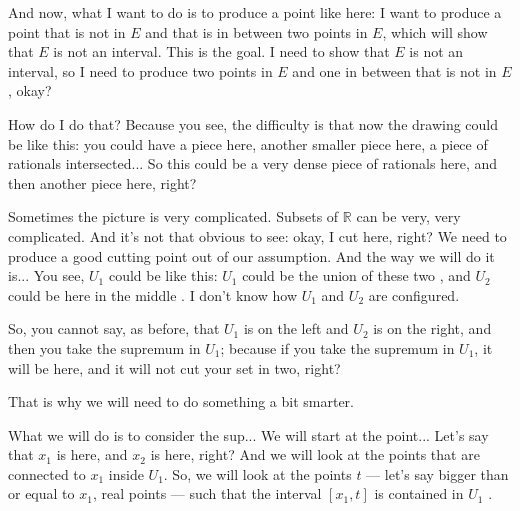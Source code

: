\begin{proofWrapper}
\begin{hidden}
\end{hidden}

\begin{speech}[00:11:35 - 00:13:35]
And now, what I want to do is to produce a point like here: I want to produce a point that is not in $E$ and that is in between two points in $E$, which will show that $E$ is not an interval. This is the goal. I need to show that $E$ is not an interval, so I need to produce two points in $E$ and one in between that is not in $E$, okay?

How do I do that? Because you see, the difficulty is that now the drawing could be like this: you could have a piece here, another smaller piece here, a piece of rationals intersected... So this could be a very dense piece of rationals here, and then another piece here, right? 

Sometimes the picture is very complicated. Subsets of $\mathbb{R}$ can be very, very complicated. And it's not that obvious to see: okay, I cut here, right? We need to produce a good cutting point out of our assumption. And the way we will do it is... You see, $U_1$ could be like this: $U_1$ could be the union of these two , and $U_2$ could be here in the middle . I don't know how $U_1$ and $U_2$ are configured.

So, you cannot say, as before, that $U_1$ is on the left and $U_2$ is on the right, and then you take the supremum in $U_1$; because if you take the supremum in $U_1$, it will be here, and it will not cut your set in two, right?

That is why we will need to do something a bit smarter.
\end{speech}

\begin{speech}[00:13:35 - 00:15:10]
What we will do is to consider the sup... We will start at the point... Let's say that $x_1$ is here, and $x_2$ is here, right? And we will look at the points that are connected to $x_1$ inside $U_1$. So, we will look at the points $t$ --- let's say bigger than or equal to $x_1$, real points --- such that the interval $[x_1, t]$ is contained in $U_1$ .


\end{speech}
\end{proofWrapper}
